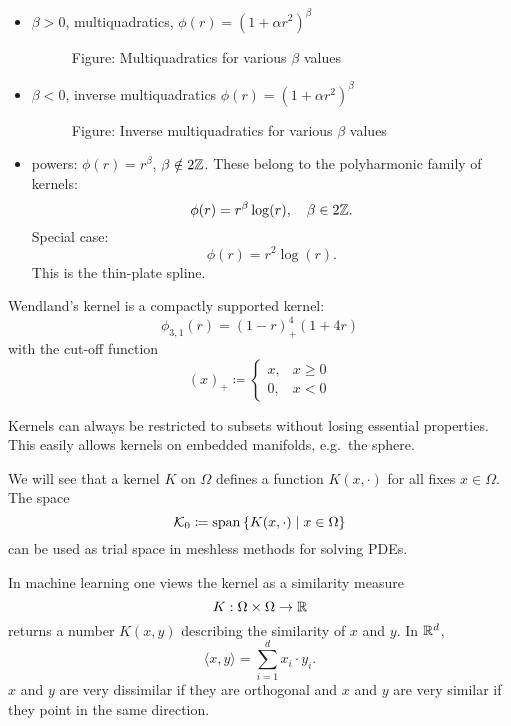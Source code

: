 \documentclass[../lecture-notes.tex]{subfiles}
\begin{document}
\begin{itemize}
\item $\beta > 0$, multiquadratics, $\phi(r) = (1 + \alpha r^2)^\beta$ 
\begin{figure}[htpb]
\centering
{}
\captionsetup{labelformat=empty}
\caption{Figure: Multiquadratics for various $\beta$ values}
\end{figure}
\item $\beta < 0$, inverse multiquadratics $\phi(r) = (1 + \alpha r^2)^\beta$
\begin{figure}[htpb]
\centering
{}
\captionsetup{labelformat=empty}
\caption{Figure: Inverse multiquadratics for various $\beta$ values}
\end{figure}
\item powers: $\phi(r) = r^\beta$, $\beta \notin 2 \mathbb{Z}$. These belong to the polyharmonic family of kernels:
\[
	\phi(r) = r^\beta \log(r), \quad \beta \in 2 \mathbb{Z}.
\]
Special case:
\[
	\phi(r) = r^2 \log (r).
\]
This is the thin-plate spline.
\end{itemize}
Wendland's kernel is a compactly supported kernel:
\[
	\phi_{3, 1}(r) = (1-r)^4_{+} (1 + 4r)
\]
with the cut-off function
\[
	(x)_+ \coloneqq \begin{cases}
		x, & x \geq 0 \\
		0, & x < 0
	\end{cases}
\]
\begin{remark}
Kernels can always be restricted to subsets without losing essential properties. This easily allows kernels on embedded manifolds, e.g.\ the sphere.
\end{remark}
\begin{remark}
We will see that a kernel $K$ on $\Omega$ defines a function $K(x, \cdot)$ for all fixes $x \in \Omega$.
The space
\[
	\mathcal{K}_0 \coloneqq \operatorname*{span} \left\{ K(x, \cdot) \mid x \in \Omega \right\}
\]
can be used as trial space in meshless methods for solving PDEs.
\end{remark}
In machine learning one views the kernel as a similarity measure
\[
	K : \Omega \times \Omega \to \mathbb{R}
\]
returns a number $K(x, y)$ describing the similarity of $x$ and $y$.
In $\mathbb{R}^d$,
\[
	\langle x, y \rangle = \sum_{i=1}^d x_i \cdot y_i.
\]
$x$ and $y$ are very dissimilar if they are orthogonal and $x$ and $y$ are very similar if they point in the same direction.
\end{document}
